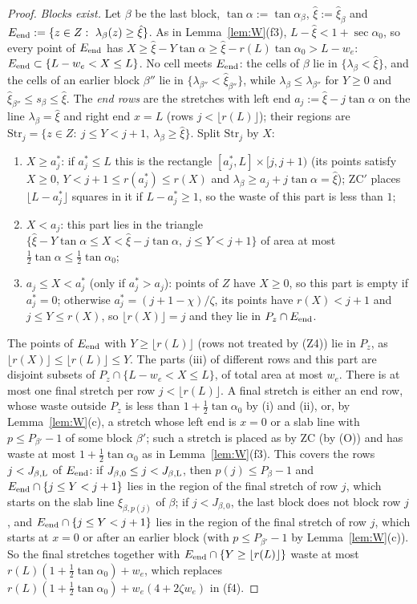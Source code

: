 \documentclass[11pt]{amsart}
\newcommand{\ta}{\tan\alpha}
\newcommand{\taz}{\tan\alpha_0}
\newcommand{\sez}{\sec\alpha_0}
\theoremstyle{definition}
\theoremstyle{remark}
\numberwithin{equation}{section}
\begin{document}
\begin{proof}
\emph{Blocks exist.} Let $\beta$ be the last block, $\ta:=\tan\alpha_\beta$, $\hat\xi:=\hat\xi_\beta$ and
$E_{\rm end}:=\{z\in Z:\ \lambda_\beta(z)\ge\hat\xi\}$. As in Lemma~\ref{lem:W}(f3), $L-\hat\xi<1+\sez$, so every point
of $E_{\rm end}$ has $X\ge\hat\xi-Y\ta\ge\hat\xi-r(L)\taz>L-w_e$: $E_{\rm end}\subset\{L-w_e<X\le L\}$. No cell meets
$E_{\rm end}$: the cells of $\beta$ lie in $\{\lambda_\beta<\hat\xi\}$, and the cells of an earlier block $\beta''$ lie
in $\{\lambda_{\beta''}<\hat\xi_{\beta''}\}$, while $\lambda_\beta\le\lambda_{\beta''}$ for $Y\ge0$ and
$\hat\xi_{\beta''}\le s_\beta\le\hat\xi$. The \emph{end rows} are the stretches with left end $a_j:=\hat\xi-j\ta$ on the
line $\lambda_\beta=\hat\xi$ and right end $x=L$ (rows $j<\lfloor r(L)\rfloor$); their regions are
$\mathrm{Str}_j=\{z\in Z:\ j\le Y<j+1,\ \lambda_\beta\ge\hat\xi\}$. Split $\mathrm{Str}_j$ by $X$:
\begin{enumerate}[label=(\roman*)]
\item $X\ge a_j^*$: if $a_j^*\le L$ this is the rectangle $[a_j^*,L]\times[j,j+1)$ (its points satisfy $X\ge0$,
$Y<j+1\le r(a_j^*)\le r(X)$ and $\lambda_\beta\ge a_j+j\ta=\hat\xi$); ZC$'$ places $\lfloor L-a_j^*\rfloor$ squares in it
if $L-a_j^*\ge1$, so the waste of this part is less than $1$;
\item $X<a_j$: this part lies in the triangle $\{\hat\xi-Y\ta\le X<\hat\xi-j\ta,\ j\le Y<j+1\}$ of area at most
$\frac12\ta\le\frac12\taz$;
\item $a_j\le X<a_j^*$ (only if $a_j^*>a_j$): points of $Z$ have $X\ge0$, so this part is empty if $a_j^*=0$; otherwise
$a_j^*=(j+1-\chi)/\zeta$, its points have $r(X)<j+1$ and $j\le Y\le r(X)$, so $\lfloor r(X)\rfloor=j$ and they lie in
$P_z\cap E_{\rm end}$.
\end{enumerate}
The points of $E_{\rm end}$ with $Y\ge\lfloor r(L)\rfloor$ (rows not treated by (Z4)) lie in $P_z$, as
$\lfloor r(X)\rfloor\le\lfloor r(L)\rfloor\le Y$. The parts (iii) of different rows and this part are disjoint subsets of
$P_z\cap\{L-w_e<X\le L\}$, of total area at most $w_e$. There is at most one final stretch per row
$j<\lfloor r(L)\rfloor$. A final stretch is either an end row, whose waste outside $P_z$ is less than $1+\frac12\taz$
by (i) and (ii), or, by Lemma~\ref{lem:W}(c), a stretch whose left end is $x=0$ or a slab line with $p\le P_{\beta'}-1$
of some block $\beta'$; such a stretch is placed as by ZC (by (O)) and has waste at most $1+\frac12\taz$ as in
Lemma~\ref{lem:W}(f3). This covers the rows $j<J_{\beta,\rm L}$ of $E_{\rm end}$: if $J_{\beta,0}\le j<J_{\beta,\rm L}$,
then $p(j)\le P_\beta-1$ and $E_{\rm end}\cap\{j\le Y<j+1\}$ lies in the region of the final stretch of row $j$, which
starts on the slab line $\xi_{\beta,p(j)}$ of $\beta$; if $j<J_{\beta,0}$, the last block does not block row $j$, and
$E_{\rm end}\cap\{j\le Y<j+1\}$ lies in the region of the final stretch of row $j$, which starts at $x=0$ or after an
earlier block (with $p\le P_{\beta'}-1$ by Lemma~\ref{lem:W}(c)). So the final stretches together with
$E_{\rm end}\cap\{Y\ge\lfloor r(L)\rfloor\}$ waste at most $r(L)(1+\frac12\taz)+w_e$, which replaces
$r(L)(1+\frac12\taz)+w_e(4+2\zeta w_e)$ in (f4).
\end{proof}
\end{document}
